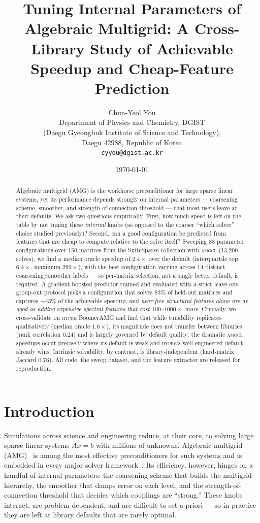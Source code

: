 \documentclass[11pt]{article}
\title{\bfseries Tuning Internal Parameters of Algebraic Multigrid:
A Cross-Library Study of Achievable Speedup and Cheap-Feature Prediction}
\author{Chun-Yeol You\\
  Department of Physics and Chemistry, DGIST\\
  (Daegu Gyeongbuk Institute of Science and Technology),\\
  Daegu 42988, Republic of Korea\\
  \texttt{cyyou@dgist.ac.kr}}
\date{\today}
\newcommand{\amgcl}{\textsc{amgcl}}
\newcommand{\hypre}{\textsc{hypre}}
\begin{document}
\maketitle

\begin{abstract}
Algebraic multigrid (AMG) is the workhorse preconditioner for large sparse
linear systems, yet its performance depends strongly on internal parameters
--- coarsening scheme, smoother, and strength-of-connection threshold --- that
most users leave at their defaults. We ask two questions empirically. First,
how much speed is left on the table by not tuning these \emph{internal} knobs
(as opposed to the coarser ``which solver'' choice studied previously)? Second,
can a good configuration be predicted from features that are cheap to compute
relative to the solve itself? Sweeping 88 parameter configurations over 150
matrices from the SuiteSparse collection with \amgcl{} (13{,}200 solves), we
find a median oracle speedup of $2.4\times$ over the default (interquartile top
$6.4\times$, maximum $292\times$), with the best configuration varying across
14 distinct coarsening/smoother labels --- so per-matrix selection, not a
single better default, is required. A gradient-boosted predictor trained and
evaluated with a strict leave-one-group-out protocol picks a configuration that
solves $83\%$ of held-out matrices and captures $\sim\!43\%$ of the achievable
speedup, and \emph{near-free structural features alone are as good as adding
expensive spectral features that cost $100$--$1000\times$ more}. Crucially, we
cross-validate on \hypre{} BoomerAMG and find that while tunability replicates
qualitatively (median oracle $1.6\times$), its magnitude does not transfer
between libraries (rank correlation $0.24$) and is largely governed by default
quality: the dramatic \amgcl{} speedups occur precisely where its default is
weak and \hypre{}'s well-engineered default already wins. Intrinsic solvability,
by contrast, is library-independent (hard-matrix Jaccard $0.76$). All code,
the sweep dataset, and the feature extractor are released for reproduction.
\end{abstract}

\section{Introduction}
\label{sec:intro}

Simulations across science and engineering reduce, at their core, to solving
large sparse linear systems $Ax=b$ with millions of unknowns. Algebraic
multigrid (AMG)~\cite{ruge1987,stuben2001,vanek1996} is among the most
effective preconditioners for such systems and is embedded in every major
solver framework~\cite{petsc,trilinos,hypre,amgcl}. Its efficiency, however,
hinges on a handful of internal parameters: the coarsening scheme that builds
the multigrid hierarchy, the smoother that damps error on each level, and the
strength-of-connection threshold that decides which couplings are ``strong.''
These knobs interact, are problem-dependent, and are difficult to set a priori
--- so in practice they are left at library defaults that are rarely optimal.
\end{document}

